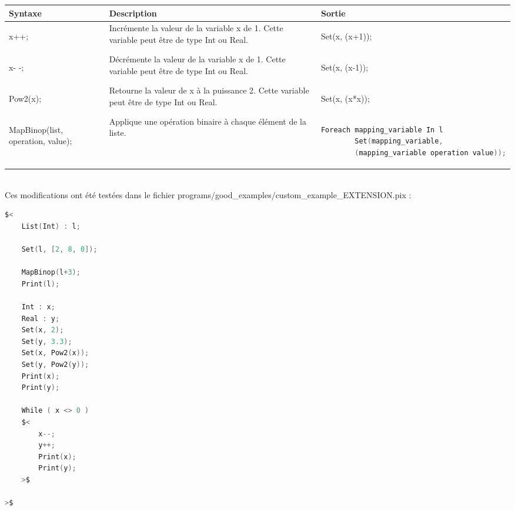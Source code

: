 \documentclass{report}
\begin{document}
    \begin{tabular}{| m{3cm} | m{7cm} | m{5cm} |}
        \hline
        Syntaxe & Description & Sortie \\
        \hline
        \begin{center}
x++;
        \end{center}
        & Incrémente la valeur de la variable x de 1. Cette variable peut être de type Int ou Real. & 
        \begin{center}
Set(x, (x+1));
        \end{center}\\
        \hline
        \begin{center}
x- -;
        \end{center}
        & Décrémente la valeur de la variable x de 1. Cette variable peut être de type Int ou Real. & 
        \begin{center}
Set(x, (x-1));
        \end{center}\\
        \hline
        \begin{center}
Pow2(x);
        \end{center}
        & Retourne la valeur de x à la puissance 2. Cette variable peut être de type Int ou Real. & 
        \begin{center}
Set(x, (x*x));
        \end{center}\\
        \hline
        {\tiny
        \begin{center}
MapBinop(list, 
         operation, 
         value);
        \end{center}
        }
        & Applique une opération binaire à chaque élément de la liste. & 
        {\tiny
        \begin{lstlisting}[language=C, basicstyle=\ttfamily]
Foreach mapping_variable In l
        Set(mapping_variable, 
        (mapping_variable operation value));
        \end{lstlisting}
        }\\
        \hline
    \end{tabular}\\

Ces modifications ont été testées dans le fichier programs/good\_examples/custom\_example\_EXTENSION.pix :\\

    \begin{lstlisting}[language=C, basicstyle=\ttfamily]
$<
    List(Int) : l;

    Set(l, [2, 8, 0]);
    
    MapBinop(l+3);
    Print(l);

    Int : x;
    Real : y;
    Set(x, 2);
    Set(y, 3.3);
    Set(x, Pow2(x));
    Set(y, Pow2(y));
    Print(x);
    Print(y);

    While ( x <> 0 )
    $<
        x--;
        y++;
        Print(x);
        Print(y);
    >$
    
>$
    \end{lstlisting}
\end{document}
